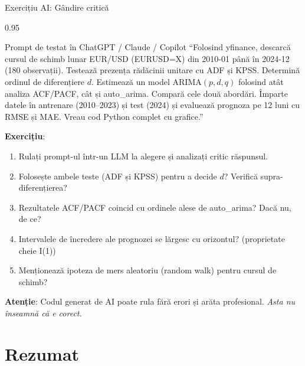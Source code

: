 \documentclass[9pt, aspectratio=169, t]{beamer}
\begin{document}
\begin{frame}{Exercițiu AI: Gândire critică}
    \begin{cminipage}{0.95\textwidth}
    \vspace{-3mm}
    \begin{block}{\footnotesize Prompt de testat în ChatGPT / Claude / Copilot}
        {\footnotesize
        ``Folosind yfinance, descarcă cursul de schimb lunar EUR/USD (EURUSD=X) din 2010-01 până în 2024-12 (180 observații). Testează prezența rădăcinii unitare cu ADF și KPSS. Determină ordinul de diferențiere $d$. Estimează un model ARIMA$(p,d,q)$ folosind atât analiza ACF/PACF, cât și auto\_arima. Compară cele două abordări. Împarte datele în antrenare (2010--2023) și test (2024) și evaluează prognoza pe 12 luni cu RMSE și MAE. Vreau cod Python complet cu grafice.''
        }
    \end{block}
    \vspace{-2mm}
    {\footnotesize
    \textbf{Exercițiu}:
    \begin{enumerate}\setlength{\itemsep}{0pt}
        \item Rulați prompt-ul într-un LLM la alegere și analizați critic răspunsul.
        \item Folosește ambele teste (ADF și KPSS) pentru a decide $d$? Verifică supra-diferențierea?
        \item Rezultatele ACF/PACF coincid cu ordinele alese de auto\_arima? Dacă nu, de ce?
        \item Intervalele de încredere ale prognozei se lărgesc cu orizontul? (proprietate cheie I(1))
        \item Menționează ipoteza de mers aleatoriu (random walk) pentru cursul de schimb?
    \end{enumerate}
    }
    \vspace{-2mm}
    \begin{alertblock}{}
        {\footnotesize \textbf{Atenție}: Codul generat de AI poate rula fără erori și arăta profesional. \textit{Asta nu înseamnă că e corect.}}
    \end{alertblock}
    \end{cminipage}
\end{frame}

\section{Rezumat}
\end{document}

